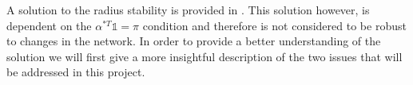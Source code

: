 A solution to the radius stability is provided in \cite{ramirez2010distributed}. This solution however, is dependent on the $\alpha^{*T} \mathbb{1} = \pi$ condition and therefore is not considered to be robust to changes in the network. In order to provide a better understanding of the solution we will first give a more insightful description of the two issues that will be addressed in this project.



